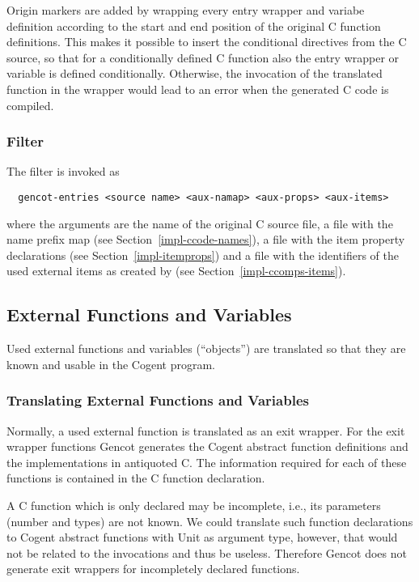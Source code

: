 Origin markers are added by wrapping every entry wrapper and variabe definition according to the start and end position of the 
original C function definitions. This makes it possible to insert the conditional directives from the C source,
so that for a conditionally defined C function also the entry wrapper or variable is defined conditionally. Otherwise,
the invocation of the translated function in the wrapper would lead to an error when the generated C code
is compiled.

\subsubsection{Filter }

The filter  is invoked as
\begin{verbatim}
  gencot-entries <source name> <aux-namap> <aux-props> <aux-items>
\end{verbatim}
where the arguments are the name of the original C source file, a file  with the name prefix map 
(see Section~\ref{impl-ccode-names}), a file  with the item property declarations (see 
Section~\ref{impl-itemprops}) and a file  with the identifiers of the used external items as created 
by  (see Section~\ref{impl-ccomps-items}).

\subsection{External Functions and Variables}
\label{impl-ccomps-externs}

Used external functions and variables (``objects'') are translated so that they are known and usable
in the Cogent program.

\subsubsection{Translating External Functions and Variables}

Normally, a used external function is translated as an exit wrapper.
For the exit wrapper functions Gencot generates the Cogent abstract function definitions and the implementations
in antiquoted C. 
The information required for each of these functions is contained in the C function declaration.

A C function which is only declared may be incomplete, i.e., its parameters (number and types) are not known. 
We could translate such function declarations to Cogent abstract functions with Unit as argument type, however,
that would not be related to the invocations and thus be useless. Therefore Gencot does not generate exit 
wrappers for incompletely declared functions.

